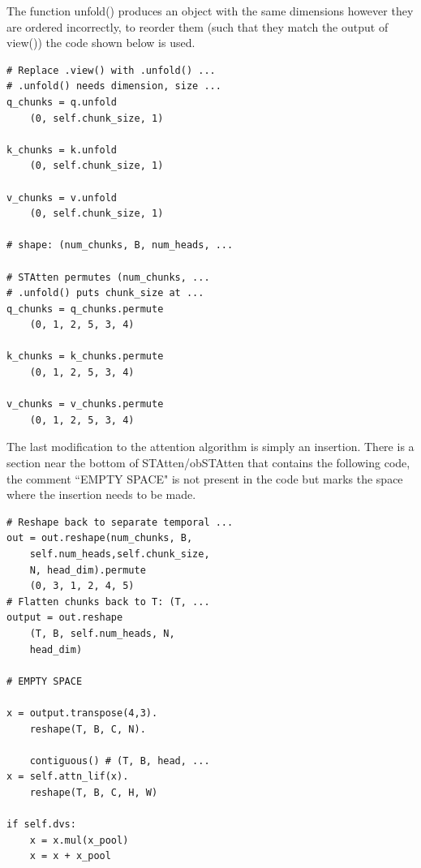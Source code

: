 \documentclass[../main.tex]{subfiles}
\begin{document}
\noindent The function unfold() produces an object with the same dimensions however they are ordered incorrectly, to reorder them (such that they match the output of view()) the code shown below is used.
\begin{verbatim}
# Replace .view() with .unfold() ...
# .unfold() needs dimension, size ...
q_chunks = q.unfold
	(0, self.chunk_size, 1)

k_chunks = k.unfold
	(0, self.chunk_size, 1)

v_chunks = v.unfold
	(0, self.chunk_size, 1)
	
# shape: (num_chunks, B, num_heads, ...

# STAtten permutes (num_chunks, ...
# .unfold() puts chunk_size at ...
q_chunks = q_chunks.permute
	(0, 1, 2, 5, 3, 4)
	
k_chunks = k_chunks.permute
	(0, 1, 2, 5, 3, 4)
	
v_chunks = v_chunks.permute
	(0, 1, 2, 5, 3, 4)
\end{verbatim}




\noindent The last modification to the attention algorithm is simply an insertion. There is a section near the bottom of STAtten/obSTAtten that contains the following code, the comment ``EMPTY SPACE" is not present in the code but marks the space where the insertion needs to be made.
\begin{verbatim}
# Reshape back to separate temporal ...
out = out.reshape(num_chunks, B, 
	self.num_heads,self.chunk_size, 
	N, head_dim).permute
	(0, 3, 1, 2, 4, 5)
# Flatten chunks back to T: (T, ...
output = out.reshape
	(T, B, self.num_heads, N, 
	head_dim)

# EMPTY SPACE

x = output.transpose(4,3).
	reshape(T, B, C, N).
	
	contiguous() # (T, B, head, ...
x = self.attn_lif(x).
	reshape(T, B, C, H, W)
	
if self.dvs:
	x = x.mul(x_pool)
   	x = x + x_pool
\end{verbatim}
\end{document}

